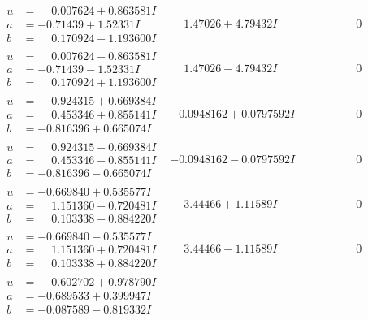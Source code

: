 \documentclass[1p]{elsarticle_modified}
\theoremstyle{definition}
\begin{document}
$$\begin{array}{c|c|c}
\begin{aligned}
u &= \phantom{-}0.007624 + 0.863581 I \\
a &= -0.71439 + 1.52331 I \\
b &= \phantom{-}0.170924 - 1.193600 I\end{aligned}
 & \phantom{-}1.47026 + 4.79432 I & \phantom{-0.000000 } 0 \\ \hline\begin{aligned}
u &= \phantom{-}0.007624 - 0.863581 I \\
a &= -0.71439 - 1.52331 I \\
b &= \phantom{-}0.170924 + 1.193600 I\end{aligned}
 & \phantom{-}1.47026 - 4.79432 I & \phantom{-0.000000 } 0 \\ \hline\begin{aligned}
u &= \phantom{-}0.924315 + 0.669384 I \\
a &= \phantom{-}0.453346 + 0.855141 I \\
b &= -0.816396 + 0.665074 I\end{aligned}
 & -0.0948162 + 0.0797592 I & \phantom{-0.000000 } 0 \\ \hline\begin{aligned}
u &= \phantom{-}0.924315 - 0.669384 I \\
a &= \phantom{-}0.453346 - 0.855141 I \\
b &= -0.816396 - 0.665074 I\end{aligned}
 & -0.0948162 - 0.0797592 I & \phantom{-0.000000 } 0 \\ \hline\begin{aligned}
u &= -0.669840 + 0.535577 I \\
a &= \phantom{-}1.151360 - 0.720481 I \\
b &= \phantom{-}0.103338 - 0.884220 I\end{aligned}
 & \phantom{-}3.44466 + 1.11589 I & \phantom{-0.000000 } 0 \\ \hline\begin{aligned}
u &= -0.669840 - 0.535577 I \\
a &= \phantom{-}1.151360 + 0.720481 I \\
b &= \phantom{-}0.103338 + 0.884220 I\end{aligned}
 & \phantom{-}3.44466 - 1.11589 I & \phantom{-0.000000 } 0 \\ \hline\begin{aligned}
u &= \phantom{-}0.602702 + 0.978790 I \\
a &= -0.689533 + 0.399947 I \\
b &= -0.087589 - 0.819332 I\end{aligned}

\end{array}$$
\end{document}
